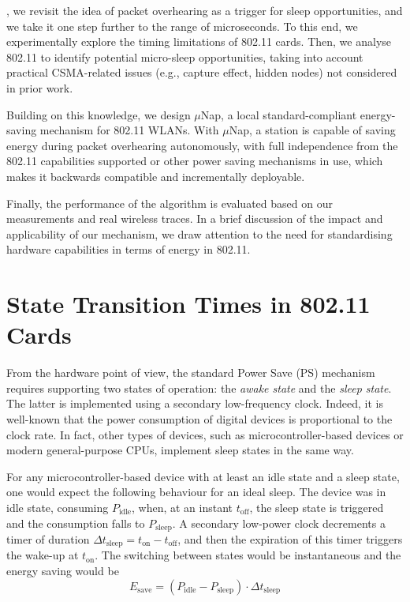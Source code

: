 \documentclass[twoside,nohyper]{tufte-book}
\theoremstyle{definition}
\theoremstyle{definition}
\theoremstyle{definition}
\theoremstyle{remark}
\begin{document}
, we revisit the idea of packet overhearing
as a trigger for sleep opportunities, and we take it one step further to
the range of microseconds. To this end, we experimentally explore the
timing limitations of 802.11 cards. Then, we analyse 802.11 to identify
potential micro-sleep opportunities, taking into account practical
CSMA-related issues (e.g., capture effect, hidden nodes) not considered
in prior work.

Building on this knowledge, we design \(\mu\)Nap, a local
standard-compliant energy-saving mechanism for 802.11 WLANs. With
\(\mu\)Nap, a station is capable of saving energy during packet
overhearing autonomously, with full independence from the 802.11
capabilities supported or other power saving mechanisms in use, which
makes it backwards compatible and incrementally deployable.

Finally, the performance of the algorithm is evaluated based on our
measurements and real wireless traces. In a brief discussion of the
impact and applicability of our mechanism, we draw attention to the need
for standardising hardware capabilities in terms of energy in 802.11.

\hypertarget{state-transition-times}{%
\section{State Transition Times in 802.11
Cards}\label{state-transition-times}}

From the hardware point of view, the standard Power Save (PS) mechanism
requires supporting two states of operation: the \emph{awake state} and
the \emph{sleep state}. The latter is implemented using a secondary
low-frequency clock. Indeed, it is well-known that the power consumption
of digital devices is proportional to the clock
rate\cite[0pt]{Zhang2012}.
In fact, other types of devices, such as microcontroller-based devices
or modern general-purpose CPUs, implement sleep states in the same way.

For any microcontroller-based device with at least an idle state and a
sleep state, one would expect the following behaviour for an ideal
sleep. The device was in idle state, consuming \(P_\mathrm{idle}\),
when, at an instant \(t_\mathrm{off}\), the sleep state is triggered and
the consumption falls to \(P_\mathrm{sleep}\). A secondary low-power
clock decrements a timer of duration
\(\Delta t_\mathrm{sleep} = t_\mathrm{on} - t_\mathrm{off}\), and then
the expiration of this timer triggers the wake-up at \(t_\mathrm{on}\).
The switching between states would be instantaneous and the energy
saving would be
%
\begin{equation}
 E_\mathrm{save} = (P_\mathrm{idle} - P_\mathrm{sleep}) \cdot \Delta t_\mathrm{sleep}
 \label{eq:idealsleep}
\end{equation}
%
\end{document}
